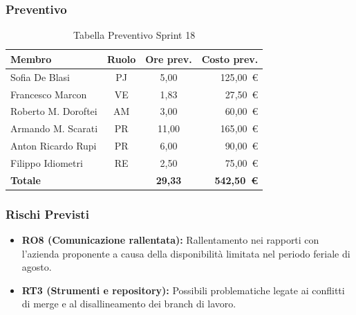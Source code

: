 \subsubsection{Preventivo}
\begin{table}[H]
    \centering
    \renewcommand{\arraystretch}{1.3}
    \begin{tabularx}{\textwidth}{|X|c|c|r|}
        \hline
        \textbf{Membro} & \textbf{Ruolo} & \textbf{Ore prev.} & \textbf{Costo prev.} \\
        \hline
        Sofia De Blasi       & PJ & 5,00 & 125{,}00~\euro \\
        Francesco Marcon     & VE & 1,83 & 27{,}50~\euro \\
        Roberto M. Doroftei  & AM & 3,00 & 60{,}00~\euro \\
        Armando M. Scarati   & PR & 11,00 & 165{,}00~\euro \\
        Anton Ricardo Rupi   & PR & 6,00 & 90{,}00~\euro \\
        Filippo Idiometri    & RE & 2,50 & 75{,}00~\euro \\
        \hline
        \textbf{Totale}      &    & \textbf{29,33} & \textbf{542{,}50~\euro} \\
        \hline
    \end{tabularx}
    \caption{Tabella Preventivo Sprint 18} 
\end{table}

\subsubsection{Rischi Previsti}
\begin{itemize}
    \item \textbf{RO8 (Comunicazione rallentata):} Rallentamento nei rapporti con l'azienda proponente a causa della disponibilità limitata nel periodo feriale di agosto.
    \item \textbf{RT3 (Strumenti e repository):} Possibili problematiche legate ai conflitti di merge e al disallineamento dei branch di lavoro.
\end{itemize}

